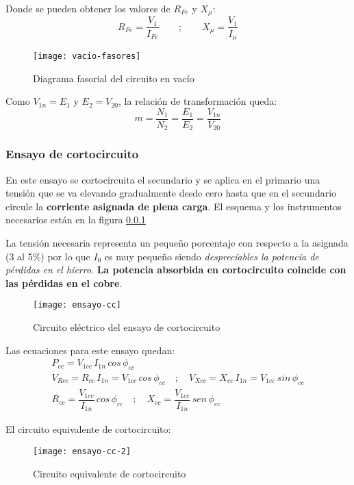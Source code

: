 Donde se pueden obtener los valores de $R_{Fe}$ y $X_{\mu}$:
\begin{equation*}
	R_{Fe}=\dfrac{V_{1}}{I_{Fe}}\qquad;\qquad X_{\mu}=\dfrac{V_{1}}{I_{\mu}}
\end{equation*}
\begin{figure}[H]
	\centering
	\texttt{[image: vacio-fasores]}
	\caption{Diagrama fasorial del circuito en vacío}
	\label{fig:vacio-fasores}
\end{figure}
Como $V_{1n}=E_{1}$ y $E_{2}=V_{20}$, la relación de transformación queda:
\begin{equation*}
	m=\dfrac{N_{1}}{N_{2}}=\dfrac{E_{1}}{E_{2}}=\dfrac{V_{1n}}{V_{20}}
\end{equation*}

\subsubsection{Ensayo de cortocircuito}
En este ensayo se cortocircuita el secundario y se aplica en el primario una tensión que se va elevando gradualmente desde cero hasta que en el secundario circule la \textbf{corriente asignada de plena carga}. El esquema y los instrumentos necesarios están en la figura \ref{}

La tensión necesaria representa un pequeño porcentaje con respecto a la asignada (3 al 5\%) por lo que $I_{0}$ es muy pequeño siendo \textit{despreciables la potencia de pérdidas en el hierro}. \textbf{La potencia absorbida en cortocircuito coincide con las pérdidas en el cobre}.
\begin{figure}[H]
	\centering
	\texttt{[image: ensayo-cc]}
	\caption{Circuito eléctrico del ensayo de cortocircuito}
	\label{fig:ensayo-cc}
\end{figure}

Las ecuaciones para este ensayo quedan:
\begin{gather*}
	P_{cc}=V_{1cc}\,I_{1n}\,cos\, \phi_{cc}\\
	V_{Rcc}=R_{cc}\,I_{1n}=V_{1cc}\,cos\,\phi_{cc}\quad;\quad V_{Xcc}=X_{cc}\,I_{1n}=V_{1cc}\,sin\,\phi_{cc}\\
	R_{cc}=\dfrac{V_{1cc}}{I_{1n}}\,cos\,\phi_{cc}\quad;\quad X_{cc}=\dfrac{V_{1cc}}{I_{1n}}\,sen\,\phi_{cc}
\end{gather*}

El circuito equivalente de cortocircuito:
\begin{figure}[H]
	\centering
	\texttt{[image: ensayo-cc-2]}
	\caption{Circuito equivalente de cortocircuito}
	\label{fig:ensayo-cc-2}
\end{figure}


